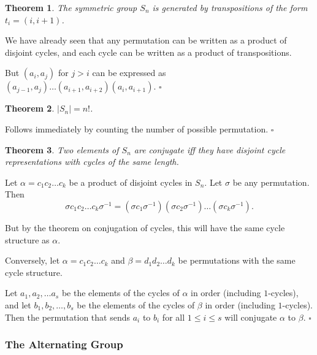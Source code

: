 \documentclass[10pt]{article}
\newtheorem{theorem}{Theorem}[section]
\newenvironment{proof}[1][Proof]{\begin{trivlist}
\item[\hskip \labelsep {\itshape #1}]}{\end{trivlist}}
\begin{document}
\begin{theorem}
The symmetric group $S_n$ is generated by transpositions of the form $t_i = (i, i + 1)$.
\end{theorem}

\begin{proof}
We have already seen that any permutation can be written as a product of disjoint cycles, and each cycle can be written as a product of transpositions.

But $(a_i, a_j)$ for $j > i$ can be expressed as $(a_{j-1}, a_j)\ldots (a_{i+1}, a_{i+2})(a_i, a_{i+1})$. $\square$
\end{proof}

\begin{theorem}
$|S_n| = n!$.
\end{theorem}

\begin{proof}
Follows immediately by counting the number of possible permutation. $\square$
\end{proof}

\begin{theorem}
Two elements of $S_n$ are conjugate iff they have disjoint cycle representations with cycles of the same length.
\end{theorem}

\begin{proof}
Let $\alpha = c_1c_2\ldots c_k$ be a product of disjoint cycles in $S_n$. Let $\sigma$ be any permutation. Then
$$\sigma c_1c_2\ldots c_k\sigma^{-1} = (\sigma c_1\sigma^{-1})(\sigma c_2 \sigma^{-1})\ldots (\sigma c_k\sigma^{-1}).$$

But by the theorem on conjugation of cycles, this will have the same cycle structure as $\alpha$.

Conversely, let $\alpha = c_1c_2\ldots c_k$ and $\beta = d_1d_2\ldots d_k$ be permutations with the same cycle structure.

Let $a_1, a_2, \ldots a_s$ be the elements of the cycles of $\alpha$ in order (including $1$-cycles), and let $b_1, b_2, \ldots, b_s$ be the elements of the cycles of $\beta$ in order (including $1$-cycles). Then the permutation that sends $a_i$ to $b_i$ for all $1 \leq i \leq s$ will conjugate $\alpha$ to $\beta$. $\square$
\end{proof}

\subsubsection{The Alternating Group}
\end{document}
